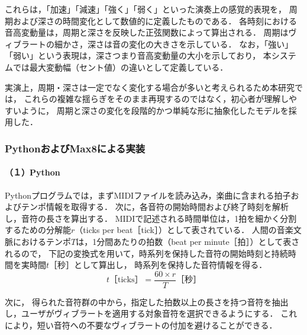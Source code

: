 これらは，「加速」「減速」「強く」「弱く」といった演奏上の感覚的表現を，
周期および深さの時間変化として数値的に定義したものである．
各時刻における音高変動量は，周期と深さを反映した正弦関数によって算出される．
周期はヴィブラートの細かさ，深さは音の変化の大きさを示している．
なお，「強い」「弱い」という表現は，深さつまり音高変動量の大小を示しており，
本システムでは最大変動幅（セント値）の違いとして定義している．

実演上，周期・深さは一定でなく変化する場合が多いと考えられるため本研究では，
これらの複雑な揺らぎをそのまま再現するのではなく，初心者が理解しやすいように，
周期と深さの変化を段階的かつ単純な形に抽象化したモデルを採用した．



\subsubsection{PythonおよびMax8による実装}

\paragraph*{（１）Python}

Pythonプログラムでは，まずMIDIファイルを読み込み，楽曲に含まれる拍子およびテンポ情報を取得する．
次に，各音符の開始時間および終了時刻を解析し，音符の長さを算出する．
MIDIで記述される時間単位は，1拍を細かく分割するための分解能$r$（ticks per beat［tick］）として表されている．
人間の音楽文脈におけるテンポ$T$は，1分間あたりの拍数（beat per minute［拍］）として表されるので，
下記の変換式を用いて，時系列を保持した音符の開始時刻と持続時間を実時間$t$［秒］として算出し，
時系列を保持した音符情報を得る．
\begin{displaymath}
	t\text{［ticks］} = \frac{60\times r}{T}    \text{［秒］}
\end{displaymath}

次に，
得られた音符群の中から，指定した拍数以上の長さを持つ音符を抽出し，ユーザがヴィブラートを適用する対象音符を選択できるようにする．
これにより，短い音符への不要なヴィブラートの付加を避けることができる．

